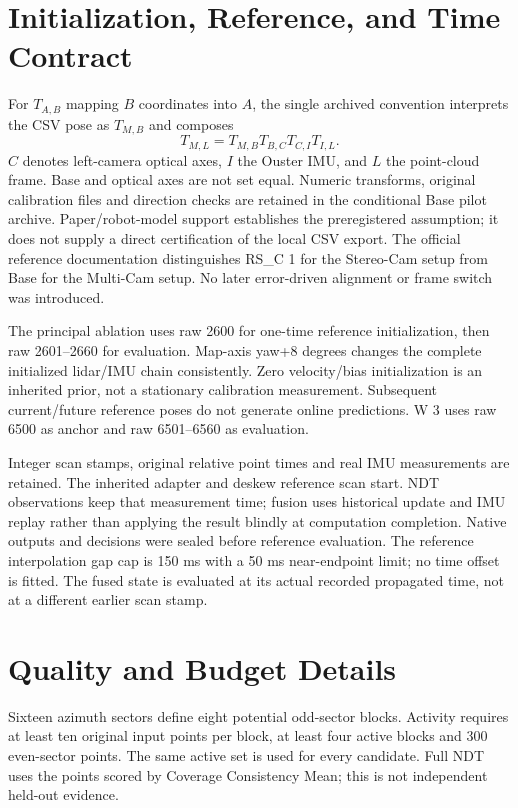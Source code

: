 \documentclass[11 pt,letterpaper]{article}
\begin{document}
\section{Initialization, Reference, and Time Contract}
For $T_{A,B}$ mapping $B$ coordinates into $A$, the single archived convention interprets the CSV pose as $T_{M,B}$ and composes
\begin{equation}
T_{M,L}=T_{M,B}T_{B,C}T_{C,I}T_{I,L}.
\end{equation}
$C$ denotes left-camera optical axes, $I$ the Ouster IMU, and $L$ the point-cloud frame. Base and optical axes are not set equal. Numeric transforms, original calibration files and direction checks are retained in the conditional Base pilot archive. Paper/robot-model support establishes the preregistered assumption; it does not supply a direct certification of the local CSV export. The official reference documentation distinguishes RS\_C 1 for the Stereo-Cam setup from Base for the Multi-Cam setup. No later error-driven alignment or frame switch was introduced.

The principal ablation uses raw 2600 for one-time reference initialization, then raw 2601--2660 for evaluation. Map-axis yaw+8 degrees changes the complete initialized lidar/IMU chain consistently. Zero velocity/bias initialization is an inherited prior, not a stationary calibration measurement. Subsequent current/future reference poses do not generate online predictions. W 3 uses raw 6500 as anchor and raw 6501--6560 as evaluation.

Integer scan stamps, original relative point times and real IMU measurements are retained. The inherited adapter and deskew reference scan start. NDT observations keep that measurement time; fusion uses historical update and IMU replay rather than applying the result blindly at computation completion. Native outputs and decisions were sealed before reference evaluation. The reference interpolation gap cap is 150 ms with a 50 ms near-endpoint limit; no time offset is fitted. The fused state is evaluated at its actual recorded propagated time, not at a different earlier scan stamp.

\section{Quality and Budget Details}
Sixteen azimuth sectors define eight potential odd-sector blocks. Activity requires at least ten original input points per block, at least four active blocks and 300 even-sector points. The same active set is used for every candidate. Full NDT uses the points scored by Coverage Consistency Mean; this is not independent held-out evidence.
\end{document}
